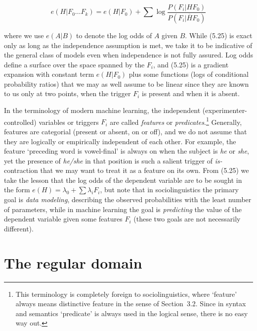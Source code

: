 \begin{equation}
e(H|F_0\ldots F_k)=e(H|F_0) + \sum \log \frac{P(F_i|HF_0)}{P(F_i|\overline{H}F_0)}
\end{equation}

\noindent
where we use $e(A|B)$ to denote the log odds of $A$ given $B$. While (5.25) is
exact only as long as the independence assumption is met, we take it to be
indicative of the general class of models even when independence is not fully
assured. Log odds define a surface over the space spanned by the $F_i$, and
(5.25) is a gradient expansion with constant term $e(H|F_0)$ plus some
functions (logs of conditional probability ratios) that we may as well assume
to be linear since they are known to us only at two points, when the trigger
$F_i$ is present and when it is absent.

In the terminology of modern machine learning, the independent
(experimenter-controlled)  variables or
triggers $F_i$ are called {\it features} or {\it predicates}.\footnote{This
  terminology is completely foreign to sociolinguistics, where `feature'
  always means distinctive feature in the sense of Section~3.2. Since in
  syntax and semantics `predicate' is always used in the logical sense, there
  is no easy way out.} Generally, features are categorial (present or absent,
on or off), and we do not assume that they are logically or empirically
independent of each other. For example, the feature `preceding word is
vowel-final' is always on when the subject is {\it he} or {\it she}, yet the
presence of {\it he/she} in that position is such a salient trigger of {\it
  is-}contraction that we may want to treat it as a feature on its own.  From
(5.25) we take the lesson that the log odds of the dependent variable are to
be sought in the form $e(H)=\lambda_0 + \sum \lambda_i F_i$, but note that in
sociolinguistics the primary goal is {\it data modeling}, describing the
observed probabilities with the least number of parameters, while in machine
learning the goal is {\it predicting} the value of the dependent variable
given some features $F_i$ (these two goals are not necessarily different).

\section{The regular domain}

